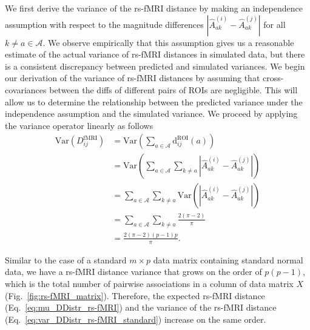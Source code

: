 \documentclass[aoas]{imsart}
\begin{document}
We first derive the variance of the rs-fMRI distance by making an independence assumption with respect to the magnitude differences $|\hat{A}^{(i)}_{ak} - \hat{A}^{(j)}_{ak}|$ for all $k \neq a \in \mathcal{A}$. We observe empirically that this assumption gives us a reasonable estimate of the actual variance of rs-fMRI distances in simulated data, but there is a consistent discrepancy between predicted and simulated variances. We begin our derivation of the variance of rs-fMRI distances by assuming that cross-covariances between the diffs of different pairs of ROIs are negligible. This will allow us to determine the relationship between the predicted variance under the independence assumption and the simulated variance. We proceed by applying the variance operator linearly as follows
%
\begin{equation}\label{eq:var_DDistr_rs-fMRI_standard}
\begin{aligned}
\text{Var}(D^\text{fMRI}_{ij}) &= \text{Var}\left(\sum_{a \in \mathcal{A}} \text{d}^\text{ROI}_{ij}(a)\right) \\
&= \text{Var}\left(\sum_{a \in \mathcal{A}} \sum_{k \neq a} \left|\hat{A}^{(i)}_{ak} - \hat{A}^{(j)}_{ak}\right|\right) \\
&= \sum_{a \in \mathcal{A}} \sum_{k \neq a} \text{Var}\left(\left|\hat{A}^{(i)}_{ak} - \hat{A}^{(j)}_{ak}\right|\right) \\
&= \sum_{a \in \mathcal{A}} \sum_{k \neq a} \frac{2(\pi - 2)}{\pi} \\
&= \frac{2(\pi - 2)(p-1)p}{\pi}.
\end{aligned}
\end{equation}

Similar to the case of a standard $m \times p$ data matrix containing standard normal data, we have a rs-fMRI distance variance that grows on the order of $p(p - 1)$, which is the total number of pairwise associations in a column of data matrix $X$ (Fig.~\ref{fig:rs-fMRI_matrix}). Therefore, the expected rs-fMRI distance (Eq.~\ref{eq:mu_DDistr_rs-fMRI}) and the variance of the rs-fMRI distance (Eq.~\ref{eq:var_DDistr_rs-fMRI_standard}) increase on the same order.
\end{document}
